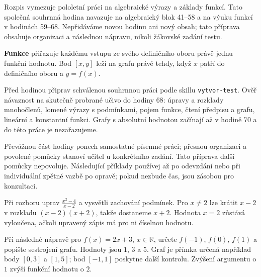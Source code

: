 \documentclass[11pt,a4paper]{article}
\begin{document}

Rozpis vymezuje pololetní práci na algebraické výrazy a základy funkcí. Tato společná souhrnná hodina navazuje na algebraický blok 41–58 a na výuku funkcí v hodinách 59–68. Nepřidáváme novou hodinu ani nový obsah; tato příprava obsahuje organizaci a následnou nápravu, nikoli žákovské zadání testu.

\begin{definiceBox}[title={Definice - Funkce a její graf},breakable=false]
\textbf{Funkce} přiřazuje každému vstupu ze svého definičního oboru právě jednu funkční hodnotu. Bod $[x,y]$ leží na grafu právě tehdy, když $x$ patří do definičního oboru a $y=f(x)$.
\end{definiceBox}


Před hodinou připrav schválenou souhrnnou práci podle skillu \texttt{vytvor-test}. Ověř návaznost na skutečně probrané učivo do hodiny 68: úpravy a rozklady mnohočlenů, lomené výrazy s podmínkami, pojem funkce, čtení předpisu a grafu, lineární a konstantní funkci. Grafy s absolutní hodnotou začínají až v hodině 70 a do této práce je nezařazujeme.

Převážnou část hodiny ponech samostatné písemné práci; přesnou organizaci a povolené pomůcky stanoví učitel u konkrétního zadání. Tato příprava další pomůcky nepovoluje. Následující příklady používej až po odevzdání nebo při individuální zpětné vazbě po opravě; pokud nezbude čas, jsou zásobou pro konzultaci.


\begin{prikladReseniBox}[title={Příklad 1},breakable=false]
Při rozboru uprav $\frac{x^2-4}{x-2}$ a vysvětli zachování podmínek.
\tcblower
Pro $x\ne2$ lze krátit $x-2$ v rozkladu $(x-2)(x+2)$, takže dostaneme $x+2$. Hodnota $x=2$ zůstává vyloučena, ačkoli upravený zápis má pro ni číselnou hodnotu.
\end{prikladReseniBox}


\begin{prikladReseniBox}[title={Příklad 2},breakable=false]
Při následné nápravě pro $f(x)=2x+3$, $x\in\mathbb R$, určete $f(-1)$, $f(0)$, $f(1)$ a popište sestrojení grafu.
\tcblower
Hodnoty jsou $1$, $3$ a $5$. Graf je přímka určená například body $[0,3]$ a $[1,5]$; bod $[-1,1]$ poskytne další kontrolu. Zvýšení argumentu o $1$ zvýší funkční hodnotu o $2$.
\end{prikladReseniBox}


\end{document}
